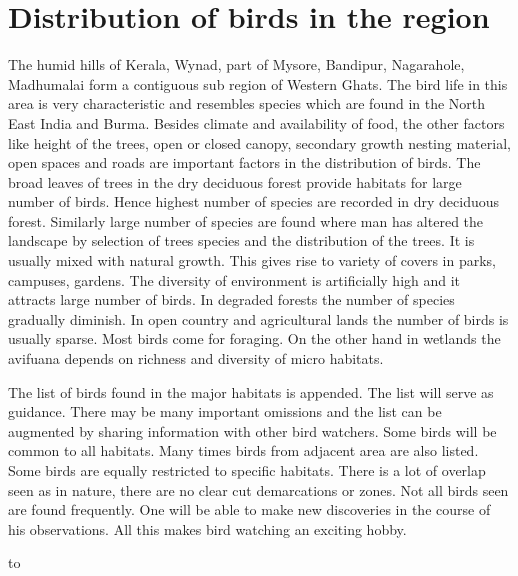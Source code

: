\chapter{Distribution of birds in the region}

The humid hills of Kerala, Wynad, part of Mysore, Bandipur, 
Nagarahole, Madhumalai form a contiguous sub region of Western 
Ghats. The bird life in this area is very characteristic and 
resembles species which are found in the North East India and Burma. 
Besides climate and availability of food, the other factors like 
height of the trees, open or closed canopy, secondary growth 
nesting material, open spaces and roads are important factors in 
the distribution of birds. The broad leaves of trees in the dry 
deciduous forest provide habitats for large number of birds. 
Hence highest number of species are recorded in dry deciduous 
forest. Similarly large number of species are found where man has 
altered the landscape by selection of trees species and the 
distribution of the trees. It is usually mixed with natural 
growth. This gives rise to variety of covers in parks, campuses, 
gardens. The diversity of environment is artificially high and it 
attracts large number of birds. In degraded forests the number of 
species gradually diminish. In open country and agricultural 
lands the number of birds is usually sparse. Most birds come for 
foraging. On the other hand in wetlands the avifuana depends on 
richness and diversity of micro habitats. 

The list of birds found in the major habitats is appended. 
The list will serve as guidance. There may be many important 
omissions and the list can be augmented by sharing information 
with other bird watchers. Some birds will be common to all 
habitats. Many times birds from adjacent area are also listed. Some birds 
are equally restricted to specific habitats. There is a lot of 
overlap seen as in nature, there are no clear cut demarcations or 
zones. Not all birds seen are found frequently. One will be able 
to make new discoveries in the course of his observations. All 
this makes bird watching an exciting hobby. 

\thispagestyle{empty}

\vbox to


\setcounter{chapter}{4}

